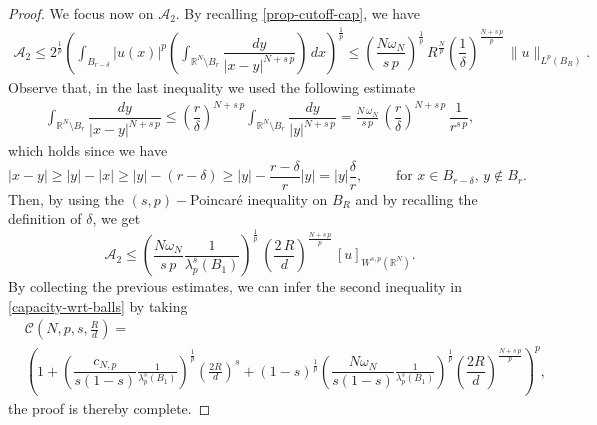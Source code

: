 \documentclass[10pt,a4paper]{amsart}
\begin{document}
\begin{proof}
	We focus now on $\mathcal{A}_2$. By recalling \eqref{prop-cutoff-cap}, we have 
	\begin{align*} 
		\mathcal{A}_2 \le 2^{\frac{1}{p}} \left(\int_{B_{r - \delta}} |u(x)|^p \left(\int_{\mathbb{R}^N \setminus B_r} \dfrac{dy}{|x-y|^{N+s\,p}}\right)\,dx \right)^{\frac{1}{p}} \le  \left(\dfrac{N \omega_N}{s\,p}\right)^{\frac{1}{p}}\,R^{\frac{N}{p}} \left(\dfrac{1}{\delta}\right)^{\frac{N+s\,p}{p}} \,\|u\|_{L^p(B_R)}.
	\end{align*}
	Observe that, in the last inequality we used the following estimate
	\[
	\begin{split}
		\int_{\mathbb{R}^N \setminus B_r} \dfrac{dy}{|x-y|^{N+s\,p}} \leq \left(\dfrac{r}{\delta}\right)^{N+s\,p} \int_{\mathbb{R}^N \setminus B_r} \dfrac{dy}{|y|^{N+s\,p}} = \frac{N\,\omega_N}{s\,p}\,\left(\dfrac{r}{\delta}\right)^{N+ s\,p}\,\dfrac{1}{r^{s\,p}},
	\end{split}
	\]
	which holds since we have
	\[
	|x - y| \geq |y| - |x| \geq |y| - (r-\delta) \geq |y| - \dfrac{r-\delta}{r} |y| = |y| \dfrac{\delta}{r}, \qquad \mbox{ for } x \in B_{r-\delta}, \, y \notin B_{r}.
	\]
	Then, by using the $(s,p)-$Poincar\'e inequality on $B_R$ and by recalling the definition of $\delta$, we get 
	\begin{equation*} 
		\mathcal{A}_2 \le \left(\dfrac{N \omega_N}{s\,p} \frac{1}{\lambda^s_{p}(B_1)}\right)^{\frac{1}{p}} \, \left(\dfrac{2\,R}{d}\right)^{\frac{N+s\,p}{p}} \,[u]_{W^{s,p}(\mathbb{R}^N)}.
	\end{equation*}
	By collecting the previous estimates, we can infer the second inequality in \eqref{capacity-wrt-balls} by taking 
	\begin{equation} \label{costante-cap-wrt-balls}
		\begin{split}
			&\mathscr{C}\left(N, p, s, \frac{R}{d}\right) = \\ 
			&\left(1 +  \left(\dfrac{c_{N,p}}{s(1-s)} \frac{1}{\lambda^s_{p}(B_1)}\right)^{\frac{1}{p}}\left(\frac{2R}{d}\right)^s +  (1-s)^{\frac{1}{p}}\left(\dfrac{N \omega_N}{s(1-s)} \frac{1}{\lambda^s_{p}(B_1)}\right)^{\frac{1}{p}} \left(\dfrac{2R}{d}\right)^{\frac{N+s\,p}{p}}\right)^p,
		\end{split}
	\end{equation}
the proof is thereby complete. 
\end{proof}
\end{document}
